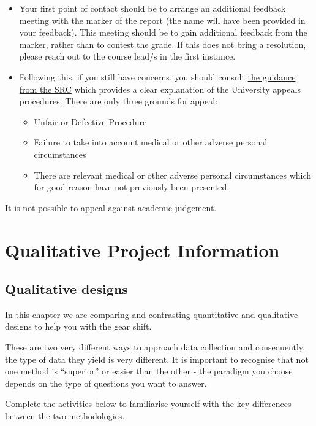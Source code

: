 \documentclass[
  english,
  letterpaper,
  DIV=11,
  numbers=noendperiod]{scrreprt}
\providecommand{\tightlist}{%
  \setlength{\itemsep}{0pt}\setlength{\parskip}{0pt}}
\begin{document}
\begin{itemize}
\item
  Your first point of contact should be to arrange an additional
  feedback meeting with the marker of the report (the name will have
  been provided in your feedback). This meeting should be to gain
  additional feedback from the marker, rather than to contest the grade.
  If this does not bring a resolution, please reach out to the course
  lead/s in the first instance.
\item
  Following this, if you still have concerns, you should consult
  \href{https://www.glasgowunisrc.org/advice/academic/appeals/}{the
  guidance from the SRC} which provides a clear explanation of the
  University appeals procedures. There are only three grounds for
  appeal:

  \begin{itemize}
  \tightlist
  \item
    Unfair or Defective Procedure
  \item
    Failure to take into account medical or other adverse personal
    circumstances
  \item
    There are relevant medical or other adverse personal circumstances
    which for good reason have not previously been presented.
  \end{itemize}
\end{itemize}

It is not possible to appeal against academic judgement.

\part{Qualitative Project Information}

\chapter{Qualitative designs}\label{ch5_qual_designs}

In this chapter we are comparing and contrasting quantitative and
qualitative designs to help you with the gear shift.

These are two very different ways to approach data collection and
consequently, the type of data they yield is very different. It is
important to recognise that not one method is ``superior'' or easier
than the other - the paradigm you choose depends on the type of
questions you want to answer.

Complete the activities below to familiarise yourself with the key
differences between the two methodologies.
\end{document}
